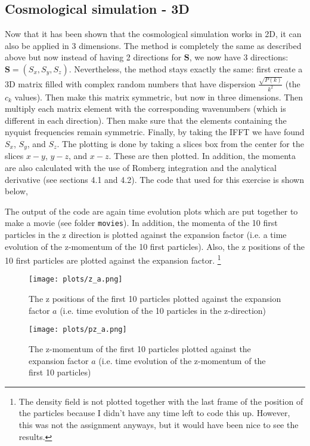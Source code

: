 \subsection{Cosmological simulation - 3D}

Now that it has been shown that the cosmological simulation works in 2D, it can also be applied in 3 dimensions. The method is completely the same as described above but now instead of having 2 directions for $\textbf{S}$, we now have 3 directions: $\textbf{S} = (S_x,S_y,S_z)$. Nevertheless, the method stays exactly the same: first create a 3D matrix filled with complex random numbers that have dispersion $\frac{\sqrt{P(k)}}{k^2}$ (the $c_k$ values). Then make this matrix symmetric, but now in three dimensions. Then multiply each matrix element with the corresponding wavenumbers (which is different in each direction). Then make sure that the elements containing the nyquist frequencies remain symmetric. Finally, by taking the IFFT we have found $S_x$, $S_y$, and $S_z$. The plotting is done by taking a slices box from the center for the slices $x-y$, $y-z$, and $x-z$. These are then plotted. In addition, the momenta are also calculated with the use of Romberg integration and the analytical derivative (see sections 4.1 and 4.2). The code that used for this exercise is shown below,



The output of the code are again time evolution plots which are put together to make a movie (see folder \texttt{movies}). In addition, the momenta of the 10 first particles in the z direction is plotted against the expansion factor (i.e. a time evolution of the z-momentum of the 10 first particles). Also, the z positions of the 10 first particles are plotted against the expansion factor. \footnote{The density field is not plotted together with the last frame of the position of the particles because I didn't have any time left to code this up. However, this was not the assignment anyways, but it would have been nice to see the results.}

\begin{figure}[h]
\centering
\texttt{[image: plots/z\_a.png]}
\caption{The z positions of the first 10 particles plotted against the expansion factor $a$ (i.e. time evolution of the 10 particles in the z-direction)}
\label{z_pos}
\end{figure}

\begin{figure}[h]
\centering
\texttt{[image: plots/pz\_a.png]}
\caption{The z-momentum of the first 10 particles plotted against the expansion factor $a$ (i.e. time evolution of the z-momentum of the first 10 particles)}
\label{z_p}
\end{figure}

